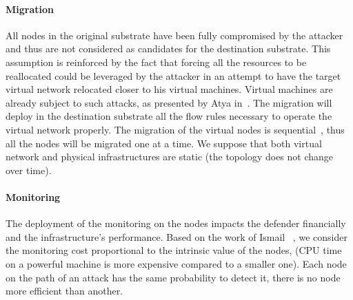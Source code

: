 \paragraph{Migration}
All nodes in the original substrate have been fully compromised by the attacker and thus are not considered as candidates for the destination substrate.  
This assumption is reinforced by the fact that forcing all the resources to be reallocated could be leveraged by the attacker in an attempt to have the target virtual network relocated closer to his virtual machines.
Virtual machines are already subject to such attacks, as presented by Atya \etal in~\cite{stalling-atya2017,malicious-atya2017}.
The migration will deploy in the destination substrate all the flow rules necessary to operate the virtual network properly. The migration of the virtual nodes is sequential~\cite{Lime-Ghorbani2014}, thus all the nodes will be migrated one at a time.
We suppose that both virtual network and physical infrastructures are static (\ie the topology does not change over time).

\paragraph{Monitoring}
The deployment of the monitoring on the nodes impacts the defender financially and the infrastructure's performance. Based on the work of Ismail \etal~\cite{interdep-ismail2017}, we consider the monitoring cost  proportional to the intrinsic value of the nodes, (\eg CPU time on a powerful machine is more expensive compared to a smaller one). 
Each node on the path of an attack has the same probability to detect it, \eg there is no node more efficient than another. 


